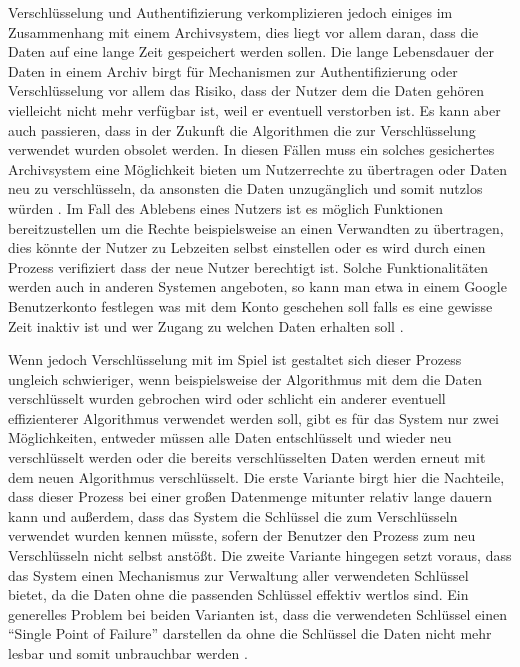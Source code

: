 \documentclass[conference,compsoc,final,a4paper]{IEEEtran}
\begin{document}
Verschlüsselung und Authentifizierung verkomplizieren jedoch einiges im Zusammenhang mit einem Archivsystem, dies liegt vor allem daran, dass die Daten auf eine lange Zeit gespeichert werden sollen. Die lange Lebensdauer der Daten in einem Archiv birgt für Mechanismen zur Authentifizierung oder Verschlüsselung vor allem das Risiko, dass der Nutzer dem die Daten gehören vielleicht nicht mehr verfügbar ist, weil er eventuell verstorben ist. Es kann aber auch passieren, dass in der Zukunft die Algorithmen die zur Verschlüsselung verwendet wurden obsolet werden. In diesen Fällen muss ein solches gesichertes Archivsystem eine Möglichkeit bieten um Nutzerrechte zu übertragen oder Daten neu zu verschlüsseln, da ansonsten die Daten unzugänglich und somit nutzlos würden \autocite{Storer2006}. Im Fall des Ablebens eines Nutzers ist es möglich Funktionen bereitzustellen um die Rechte beispielsweise an einen Verwandten zu übertragen, dies könnte der Nutzer zu Lebzeiten selbst einstellen oder es wird durch einen Prozess verifiziert dass der neue Nutzer berechtigt ist. Solche Funktionalitäten werden auch in anderen Systemen angeboten, so kann man etwa in einem Google Benutzerkonto festlegen was mit dem Konto geschehen soll falls es eine gewisse Zeit inaktiv ist und wer Zugang zu welchen Daten erhalten soll \autocite{GoogleKontoaktivität}.

Wenn jedoch Verschlüsselung mit im Spiel ist gestaltet sich dieser Prozess ungleich schwieriger, wenn beispielsweise der Algorithmus mit dem die Daten verschlüsselt wurden gebrochen wird oder schlicht ein anderer eventuell effizienterer Algorithmus verwendet werden soll, gibt es für das System nur zwei Möglichkeiten, entweder müssen alle Daten entschlüsselt und wieder neu verschlüsselt werden oder die bereits verschlüsselten Daten werden erneut mit dem neuen Algorithmus verschlüsselt. Die erste Variante birgt hier die Nachteile, dass dieser Prozess bei einer großen Datenmenge mitunter relativ lange dauern kann und außerdem, dass das System die Schlüssel die zum Verschlüsseln verwendet wurden kennen müsste, sofern der Benutzer den Prozess zum neu Verschlüsseln nicht selbst anstößt. Die zweite Variante hingegen setzt voraus, dass das System einen Mechanismus zur Verwaltung aller verwendeten Schlüssel bietet, da die Daten ohne die passenden Schlüssel effektiv wertlos sind. Ein generelles Problem bei beiden Varianten ist, dass die verwendeten Schlüssel einen ``Single Point of Failure'' darstellen da ohne die Schlüssel die Daten nicht mehr lesbar und somit unbrauchbar werden \autocite{Storer2006}.
\end{document}

